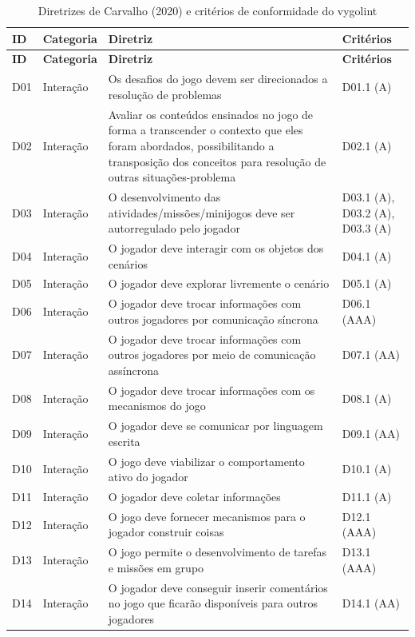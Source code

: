 \begin{longtable}{p{1.1cm}p{2.6cm}p{7.2cm}p{2.6cm}}
\caption{Diretrizes de Carvalho (2020) e critérios de conformidade do vygolint}\label{tab:catalogo_vygolint}\\
\hline
\textbf{ID} & \textbf{Categoria} & \textbf{Diretriz} & \textbf{Critérios} \\
\hline
\endfirsthead
\hline
\textbf{ID} & \textbf{Categoria} & \textbf{Diretriz} & \textbf{Critérios} \\
\hline
\endhead
\hline
\endfoot
D01 & Interação & Os desafios do jogo devem ser direcionados a resolução de problemas & D01.1 (A) \\
D02 & Interação & Avaliar os conteúdos ensinados no jogo de forma a transcender o contexto que eles foram abordados, possibilitando a transposição dos conceitos para resolução de outras situações-problema & D02.1 (A) \\
D03 & Interação & O desenvolvimento das atividades/missões/minijogos deve ser autorregulado pelo jogador & D03.1 (A), D03.2 (A), D03.3 (A) \\
D04 & Interação & O jogador deve interagir com os objetos dos cenários & D04.1 (A) \\
D05 & Interação & O jogador deve explorar livremente o cenário & D05.1 (A) \\
D06 & Interação & O jogador deve trocar informações com outros jogadores por comunicação síncrona & D06.1 (AAA) \\
D07 & Interação & O jogador deve trocar informações com outros jogadores por meio de comunicação assíncrona & D07.1 (AA) \\
D08 & Interação & O jogador deve trocar informações com os mecanismos do jogo & D08.1 (A) \\
D09 & Interação & O jogador deve se comunicar por linguagem escrita & D09.1 (AA) \\
D10 & Interação & O jogo deve viabilizar o comportamento ativo do jogador & D10.1 (A) \\
D11 & Interação & O jogador deve coletar informações & D11.1 (A) \\
D12 & Interação & O jogo deve fornecer mecanismos para o jogador construir coisas & D12.1 (AAA) \\
D13 & Interação & O jogo permite o desenvolvimento de tarefas e missões em grupo & D13.1 (AAA) \\
D14 & Interação & O jogador deve conseguir inserir comentários no jogo que ficarão disponíveis para outros jogadores & D14.1 (AA) \\

\end{longtable}
